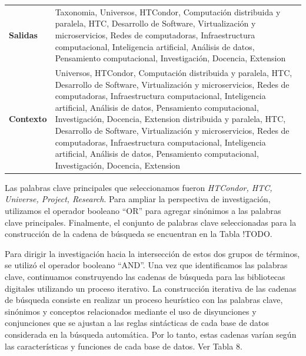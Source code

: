 \begin{table}[htbp]
\begin{tabular}{p{1.8cm}p{5.7cm}}
		\addlinespace[0.3em]
		\textbf{Salidas                } & Taxonomia, Universos, HTCondor, Computación distribuida y paralela, HTC, Desarrollo de Software, Virtualización y microservicios, Redes de computadoras, Infraestructura computacional, Inteligencia artificial, Análisis de datos, Pensamiento computacional, Investigación, Docencia, Extension                                                                                                                                                                                                                                            \\
		\addlinespace[0.3em]
		\textbf{Contexto}                & Universos, HTCondor, Computación distribuida y paralela, HTC, Desarrollo de Software, Virtualización y microservicios, Redes de computadoras, Infraestructura computacional, Inteligencia artificial, Análisis de datos, Pensamiento computacional, Investigación, Docencia, Extension distribuida y paralela, HTC, Desarrollo de Software, Virtualización y microservicios, Redes de computadoras, Infraestructura computacional, Inteligencia artificial, Análisis de datos, Pensamiento computacional, Investigación, Docencia, Extension \\
		\bottomrule
	\end{tabular}
\end{table}



Las palabras clave principales que seleccionamos fueron \textit{HTCondor, HTC, Universe, Project, Research}. Para ampliar la perspectiva de investigación, utilizamos el operador booleano ``OR'' para agregar sinónimos a las palabras clave principales.
Finalmente, el conjunto de palabras clave seleccionadas para la construcción de la cadena de búsqueda se encuentran en la Tabla !TODO.

Para dirigir la investigación hacia la intersección de estos dos grupos de términos, se utilizó el operador booleano ``AND''. Una vez que identificamos las palabras clave, continuamos construyendo las cadenas de búsqueda para las bibliotecas digitales utilizando un proceso iterativo. La construcción iterativa de las cadenas de búsqueda consiste en realizar un proceso heurístico con las palabras clave, sinónimos y conceptos relacionados mediante el uso de disyunciones y conjunciones que se ajustan a las reglas sintácticas de cada base de datos considerada en la búsqueda automática. Por lo tanto, estas cadenas varían según las características y funciones de cada base de datos. Ver Tabla 8.

